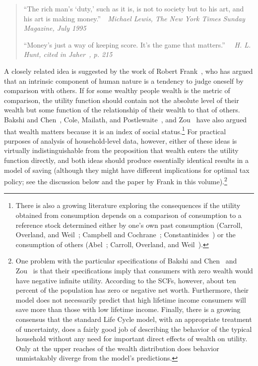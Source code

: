 \documentclass[titlepage,12pt]{article}
\begin{document}
\begin{quote}
``The rich man's `duty,' such as it is, is not to society but to his art, and 
his art is making money.''~~\emph{Michael Lewis, {\it The New York Times 
Sunday Magazine, July 1995}}

``Money's just a way of keeping score.  It's the game that matters.''
~~\emph{H. L. Hunt, cited in Jaher~\citeyear{jaher:gilded}, p. 215}
\end{quote}

A closely related idea is suggested by the work of Robert 
Frank~\citeyear{frank:rightpond}, who has argued that an intrinsic 
component of human nature is a tendency to judge oneself by comparison 
with others.  If for some wealthy people wealth is the metric of 
comparison, the utility function should contain not the absolute level 
of their wealth but some function of the relationship of their wealth 
to that of others.  Bakshi and Chen~\citeyear{bakshi&chen:spirit}, Cole, 
Mailath, and Postlewaite~\citeyear{cmp:socialnorms}, and 
Zou~\citeyear{zou:spirit} have also argued that wealth matters because it 
is an index of social status.\footnote{There is also a growing 
literature exploring the consequences if the utility obtained from 
consumption depends on a comparison of consumption to a reference 
stock determined either by one's own past consumption (Carroll, 
Overland, and Weil~\citeyear{cow:habits}; Campbell and 
Cochrane~\citeyear{campbell&cochrane:force}; 
Constantinides~\citeyear{constantinidesHabits}) or the consumption of 
others (Abel~\citeyear{abel:aerhabits}; Carroll, Overland, and 
Weil~\citeyear{cow:envy}).} For practical purposes of analysis of 
household-level data, however, either of these ideas is virtually 
indistinguishable from the proposition that wealth enters the utility 
function directly, and both ideas should produce essentially identical 
results in a model of saving (although they might have different 
implications for optimal tax policy; see the discussion below and the 
paper by Frank in this volume).\footnote{One problem with the 
particular specifications of Bakshi and Chen~\citeyear{bakshi&chen:spirit} 
and Zou~\citeyear{zou:spirit} is that their specifications imply that 
consumers with zero wealth would have negative infinite utility.  
According to the SCFs, however, about ten percent of the population 
has zero or negative net worth.  Furthermore, their model does not 
necessarily predict that high lifetime income consumers will save more 
than those with low lifetime income.  Finally, there is a growing 
consensus that the standard Life Cycle model, with an appropriate 
treatment of uncertainty, does a fairly good job of describing the 
behavior of the typical household without any need for important 
direct effects of wealth on utility.  Only at the upper reaches of the 
wealth distribution does behavior unmistakably diverge from the 
model's predictions.}
\end{document}
